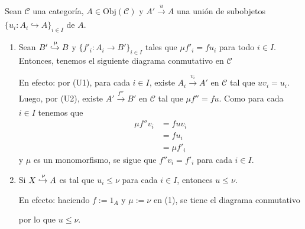 \documentclass[tesis]{subfiles}
\begin{document}
\begin{Obs}\label{Mendoza-1.3.4}
    Sean $\mathscr{C}$ una categoría, $A\in\text{Obj}(\mathscr{C})$ y $A'\xrightarrow[]{u}A$ una unión de subobjetos $\{u_i:A_i\hookrightarrow A\}_{i\in I}$ de $A$.

    \begin{enumerate}[label=(\arabic*)]
    
        \item Sean $B'\xhookrightarrow{\mu}B$ y $\{f'_i:A_i\to B'\}_{i\in I}$ tales que $\mu f'_i = fu_i$ para todo $i\in I$. Entonces, tenemos el siguiente diagrama conmutativo en $\mathscr{C}$
            \begin{center}
            \end{center}

            En efecto: por (U1), para cada $i\in I$, existe $A_i\xrightarrow[]{v_i}A'$ en $\mathscr{C}$ tal que $uv_i = u_i$. Luego, por (U2), existe $A'\xrightarrow[]{f''}B'$ en $\mathscr{C}$ tal que $\mu f'' = fu$. Como para cada $i\in I$ tenemos que
            \begin{align*}
                \mu f''v_i &= fuv_i \\
                            &= fu_i \\
                            &= \mu f'_i
            \end{align*}
            y $\mu$ es un monomorfismo, se sigue que $f''v_i = f'_i$ para cada $i\in I$.

        \item Si $X\xhookrightarrow{\nu}A$ es tal que $u_i\le\nu$ para cada $i\in I$, entonces $u\le\nu$. %

            En efecto: haciendo $f:= 1_A$ y $\mu:= \nu$ en (1), se tiene el diagrama conmutativo
            \begin{center}
            \end{center}
            por lo que $u\le\nu$.


\end{enumerate}
\end{Obs}
\end{document}
